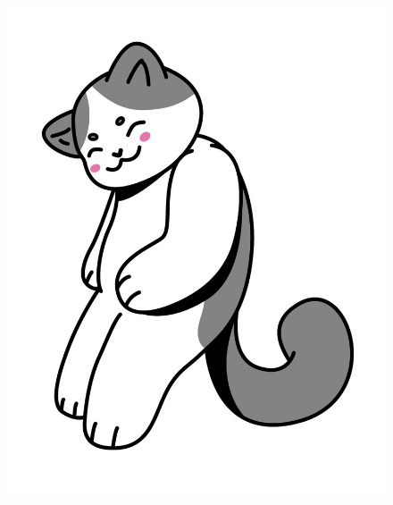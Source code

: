 
\begin{figure}[htbp]
    \centerline{\includegraphics[scale=0.20]{assets/05_gatito_lambda.jpg}}       
\end{figure}


